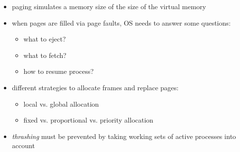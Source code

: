 \begin{summary}
  \begin{itemize}
    \item paging simulates a memory size of the size of the virtual memory
    \item when pages are filled via page faults, OS needs to answer some questions:
    \begin{itemize}
      \item what to eject?
      \item what to fetch?
      \item how to resume process?
    \end{itemize}
    \item different strategies to allocate frames and replace pages:
    \begin{itemize}
      \item local vs. global allocation
      \item fixed vs. proportional vs. priority allocation
    \end{itemize}
    \item \emph{thrashing} must be prevented by taking working sets of active processes into account
  \end{itemize}
\end{summary}